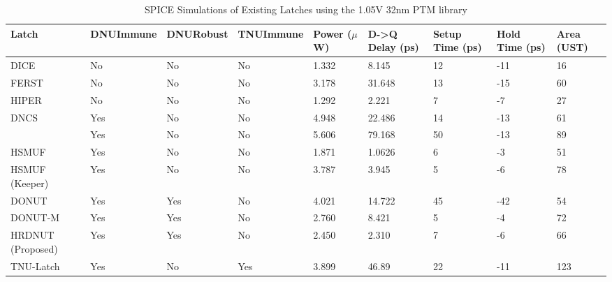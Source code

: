 \begin{table}[t]
	\begin{center}
		\caption{SPICE Simulations of Existing Latches using the 1.05V 32nm PTM library }
		\label{table:rtable}
		\begin{tabular}{|m{7em}|m{3.5em}|m{3em}|m{3.5em}|m{2.5em}|m{3.5em}|m{3.5em}|m{3.5em}|m{2em}|}
			\hline
			Latch & DNU\newline Immune & DNU\newline Robust & TNU\newline Immune & Power ($\mu$W) & D-\textgreater Q Delay (ps) & Setup Time (ps) & Hold Time (ps) & Area (UST)\\ 
			\hline
			DICE & No & No & No & 1.332 & 8.145 & 12 & -11 & 16 \\
			\hline
			FERST & No & No & No & 3.178 & 31.648 & 13 & -15 & 60 \\
			\hline
			HIPER & No & No & No & 1.292 & 2.221 & 7 & -7 & 27 \\
			\hhline{|=|=|=|=|=|=|=|=|=|}
			DNCS & Yes & No & No & 4.948 & 22.486 & 14 & -13 & 61 \\
			\hline
			\cite{Inter} & Yes & No & No & 5.606 & 79.168 & 50 & -13 & 89 \\
			\hline
			HSMUF & Yes & No & No & 1.871 & 1.0626 & 6 & -3 & 51 \\
			\hline
			HSMUF (Keeper) & Yes & No & No & 3.787 & 3.945 & 5 & -6 & 78 \\
			\hhline{|=|=|=|=|=|=|=|=|=|}
			DONUT \cite{DONUT} & Yes & Yes & No & 4.021 & 14.722 & 45 & -42 & 54 \\ 
			\hline
			DONUT-M & Yes & Yes & No & 2.760 & 8.421 & 5 & -4 & 72\\
			\hline
			HRDNUT (Proposed) & Yes & Yes & No & 2.450 & 2.310 & 7 & -6 & 66 \\
			\hline
			TNU-Latch & Yes & No & Yes & 3.899 & 46.89 & 22 & -11 & 123 \\
			\hline
		\end{tabular}
	\end{center}
\end{table}
\raggedbottom

